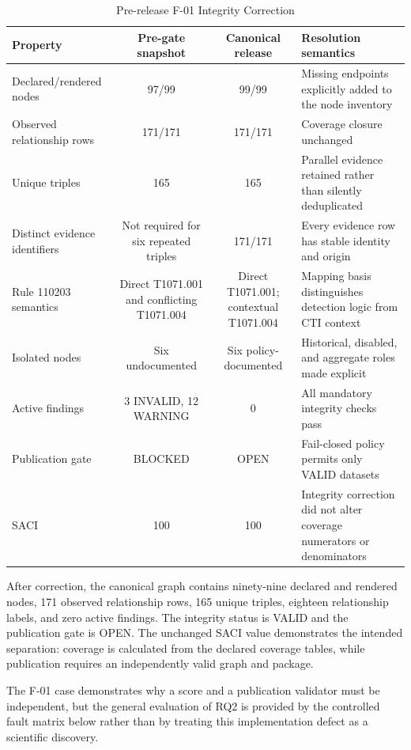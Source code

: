 \documentclass[a4paper,conference]{IEEEtran}
\begin{document}
\begin{table}[!t]
\caption{Pre-release F-01 Integrity Correction}
\label{tab:f01}
\centering
\small
\begin{tabularx}{\textwidth}{Y C C Y}
\toprule
\textbf{Property} & \textbf{Pre-gate snapshot} & \textbf{Canonical release} & \textbf{Resolution semantics} \\
\midrule
Declared/rendered nodes & 97/99 & 99/99 & Missing endpoints explicitly added to the node inventory \\
Observed relationship rows & 171/171 & 171/171 & Coverage closure unchanged \\
Unique triples & 165 & 165 & Parallel evidence retained rather than silently deduplicated \\
Distinct evidence identifiers & Not required for six repeated triples & 171/171 & Every evidence row has stable identity and origin \\
Rule 110203 semantics & Direct T1071.001 and conflicting T1071.004 & Direct T1071.001; contextual T1071.004 & Mapping basis distinguishes detection logic from CTI context \\
Isolated nodes & Six undocumented & Six policy-documented & Historical, disabled, and aggregate roles made explicit \\
Active findings & 3 INVALID, 12 WARNING & 0 & All mandatory integrity checks pass \\
Publication gate & BLOCKED & OPEN & Fail-closed policy permits only VALID datasets \\
SACI & 100 & 100 & Integrity correction did not alter coverage numerators or denominators \\
\bottomrule
\end{tabularx}
\end{table}

After correction, the canonical graph contains ninety-nine declared and rendered nodes, 171 observed relationship rows, 165 unique triples, eighteen relationship labels, and zero active findings. The integrity status is VALID and the publication gate is OPEN. The unchanged SACI value demonstrates the intended separation: coverage is calculated from the declared coverage tables, while publication requires an independently valid graph and package.

The F-01 case demonstrates why a score and a publication validator must be independent, but the general evaluation of RQ2 is provided by the controlled fault matrix below rather than by treating this implementation defect as a scientific discovery.
\end{document}
